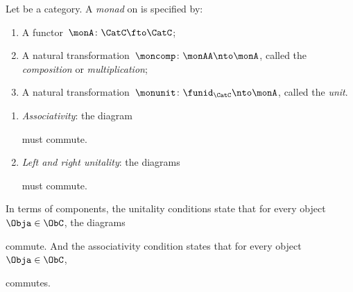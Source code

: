 \begin{ctdefinition}[Monad]
    \label{def:monad}
    Let \CatC be a category.
    A \emph{monad} on \CatC is specified by:\\
    \constit
    \begin{enumerate}
        \item A functor~$ \monA \colon \CatC \fto \CatC$;
        \item A natural transformation~$\moncomp \colon \monAA \nto \monA$, called the \emph{composition} or \emph{multiplication};
        \item A natural transformation~$\monunit \colon \funid_\CatC \nto \monA$, called the \emph{unit}.
    \end{enumerate}
    \condit
    \begin{enumerate}
        \item \emph{Associativity}: the diagram
              \begin{center}
                  \label{eq:monad-associativity}
              \end{center}
              must commute.
        \item \emph{Left and right unitality}: the diagrams
              \begin{center}
                  \label{eq:monad-unitality}
              \end{center}
              must commute.
    \end{enumerate}
\end{ctdefinition}

\begin{remark}
    \label{rem:monad-condition-components}
    In terms of components, the unitality conditions state that for every object~$\Obja \in \ObC$, the diagrams

    \begin{center}
    \end{center}

    commute.
    And the associativity condition states that for every object~$\Obja \in \ObC$,

    \begin{center}
    \end{center}

    commutes.
\end{remark}

